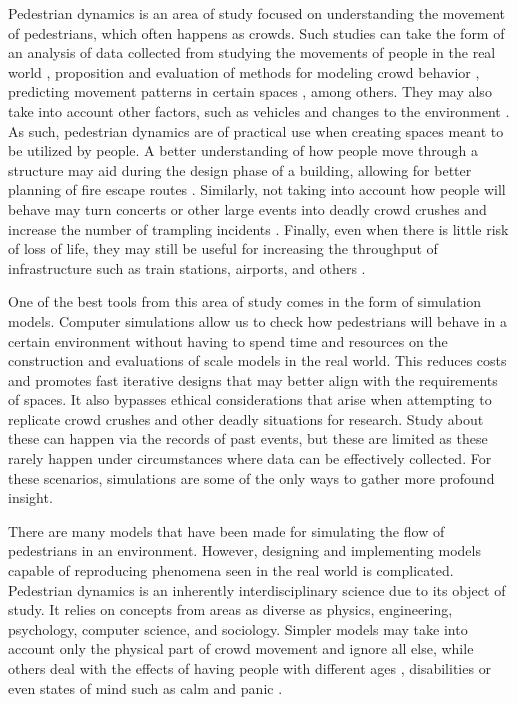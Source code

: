 \documentclass[twoside, 11pt]{article}
\begin{document}
Pedestrian dynamics is an area of study focused on understanding the movement of pedestrians, which often happens as crowds. Such studies can take the form of an analysis of data collected from studying the movements of people in the real world \cite{adrianCrowdsFrontBottlenecks2020}, proposition and evaluation of methods for modeling crowd behavior \cite{vonkruchtenEmpiricalStudySocial2017}, predicting movement patterns in certain spaces \cite{10181234}, among others. They may also take into account other factors, such as vehicles \cite{liangUnravelingCausesSeoul2024} and changes to the environment \cite{helbingSimulatingDynamicFeatures2000}. As such, pedestrian dynamics are of practical use when creating spaces meant to be utilized by people. A better understanding of how people move through a structure may aid during the design phase of a building, allowing for better planning of fire escape routes \cite{kouskoulisSystematicReviewPedestrian2017}. Similarly, not taking into account how people will behave may turn concerts or other large events into deadly crowd crushes and increase the number of trampling incidents \cite{barrStampedesNewPsychology2024}. Finally, even when there is little risk of loss of life, they may still be useful for increasing the throughput of infrastructure such as train stations, airports, and others \cite{tesoriereModellingSimulationPassenger2018}.

One of the best tools from this area of study comes in the form of simulation models. Computer simulations allow us to check how pedestrians will behave in a certain environment without having to spend time and resources on the construction and evaluations of scale models in the real world. This reduces costs and promotes fast iterative designs that may better align with the requirements of spaces. It also bypasses ethical considerations that arise when attempting to replicate crowd crushes and other deadly situations for research. Study about these can happen via the records of past events, but these are limited as these rarely happen under circumstances where data can be effectively collected. For these scenarios, simulations are some of the only ways to gather more profound insight.

There are many  models that have been made for simulating the flow of pedestrians in an environment. However, designing and implementing models capable of reproducing phenomena seen in the real world is complicated. Pedestrian dynamics is an inherently interdisciplinary science \cite{kleinmeierVadereOpenSourceSimulation2019} due to its object of study. It relies on concepts from areas as diverse as physics, engineering, psychology, computer science, and sociology. Simpler models may take into account only the physical part of crowd movement and ignore all else, while others deal with the effects of having people with different ages \cite{gorriniAgeGroupdrivenPedestrian2016}, disabilities \cite{fuExperimentalStudyBidirectional2022} or even states of mind such as calm and panic \cite{Alrashed_Shamma_2020}.
\end{document}
